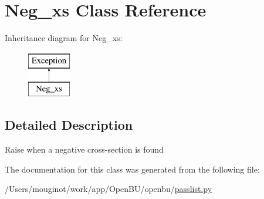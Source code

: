 \hypertarget{classopenbu_1_1passlist_1_1_neg__xs}{}\section{Neg\+\_\+xs Class Reference}
\label{classopenbu_1_1passlist_1_1_neg__xs}
Inheritance diagram for Neg\+\_\+xs\+:\begin{figure}[H]
\begin{center}
\leavevmode
\includegraphics[height=2.000000cm]{classopenbu_1_1passlist_1_1_neg__xs}
\end{center}
\end{figure}


\subsection{Detailed Description}
\begin{DoxyVerb}Raise when a negative cross-section is found\end{DoxyVerb}
 

The documentation for this class was generated from the following file\+:\begin{DoxyCompactItemize}
\item 
/\+Users/mouginot/work/app/\+Open\+B\+U/openbu/\mbox{\hyperlink{passlist_8py}{passlist.\+py}}\end{DoxyCompactItemize}
